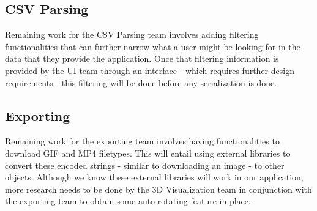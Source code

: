\documentclass[journal,10pt,onecolumn,compsoc]{IEEEtran} \usepackage[margin=1.0in]{geometry} \usepackage{pdfpages}
\begin{document}
 
 \subsection{CSV Parsing}
 Remaining work for the CSV Parsing team involves adding filtering functionalities that can further narrow what a user might be looking for in the data that they provide the application. Once that filtering information is provided by the UI team through an interface - which requires further design requirements - this filtering will be done before any serialization is done. 

 \subsection{Exporting}
 Remaining work for the exporting team involves having functionalities to download GIF and MP4 filetypes. This will entail using external libraries to convert these encoded strings - similar to downloading an image - to other objects. Although we know these external libraries will work in our application, more research needs to be done by the 3D Visualization team in conjunction with the exporting team to obtain some auto-rotating feature in place. 
 



\end{document}
